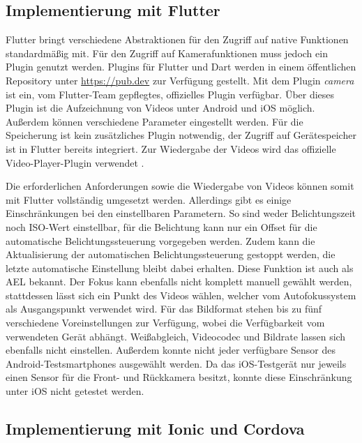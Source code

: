 \subsection{Implementierung mit Flutter}
\label{sec:evaluation_flutter}

Flutter bringt verschiedene Abstraktionen für den Zugriff auf native Funktionen standardmäßig mit.
Für den Zugriff auf Kamerafunktionen muss jedoch ein Plugin genutzt werden.
Plugins für Flutter und Dart werden in einem öffentlichen Repository unter \url{https://pub.dev} zur Verfügung gestellt.
Mit dem Plugin \textit{camera} \cite{Dart_Camera} ist ein, vom Flutter-Team gepflegtes, offizielles Plugin verfügbar. 
Über dieses Plugin ist die Aufzeichnung von Videos unter Android und iOS möglich.
Außerdem können verschiedene Parameter eingestellt werden.
Für die Speicherung ist kein zusätzliches Plugin notwendig, der Zugriff auf Gerätespeicher ist in Flutter bereits integriert.
Zur Wiedergabe der Videos wird das offizielle Video-Player-Plugin verwendet \cite{Dart_Video}.

Die erforderlichen Anforderungen sowie die Wiedergabe von Videos können somit mit Flutter vollständig umgesetzt werden.
Allerdings gibt es einige Einschränkungen bei den einstellbaren Parametern.
So sind weder Belichtungszeit noch ISO-Wert einstellbar, für die Belichtung kann nur ein Offset für die automatische Belichtungssteuerung vorgegeben werden.
Zudem kann die Aktualisierung der automatischen Belichtungssteuerung gestoppt werden, die letzte automatische Einstellung bleibt dabei erhalten.
Diese Funktion ist auch als \ac{AEL} bekannt.
Der Fokus kann ebenfalls nicht komplett manuell gewählt werden, stattdessen lässt sich ein Punkt des Videos wählen, welcher vom Autofokussystem als Ausgangspunkt verwendet wird.
Für das Bildformat stehen bis zu fünf verschiedene Voreinstellungen zur Verfügung, wobei die Verfügbarkeit vom verwendeten Gerät abhängt.
Weißabgleich, Videocodec und Bildrate lassen sich ebenfalls nicht einstellen.
Außerdem konnte nicht jeder verfügbare Sensor des Android-Testsmartphones ausgewählt werden.
Da das iOS-Testgerät nur jeweils einen Sensor für die Front- und Rückkamera besitzt, konnte diese Einschränkung unter iOS nicht getestet werden.


\subsection{Implementierung mit Ionic und Cordova}
\label{sec:evaluation_ionic}

